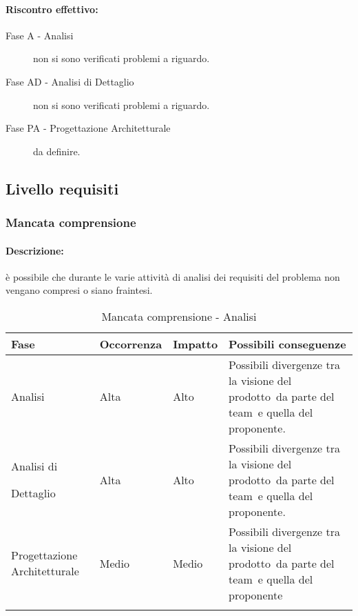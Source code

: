 \documentclass[../PianoProgetto.tex]{subfiles}
\begin{document}
	\paragraph*{Riscontro effettivo:}
		\begin{description}
			\item[Fase A - Analisi] non si sono verificati problemi a riguardo.
			\item[Fase AD - Analisi di Dettaglio] non si sono verificati problemi a riguardo.
			\item[Fase PA - Progettazione Architetturale] da definire.
		\end{description}

\newpage
\subsection{Livello requisiti}

\subsubsection{Mancata comprensione}
\label{sec:Mancata comprensione}

	\paragraph*{Descrizione:} è possibile che durante le varie attività di analisi dei requisiti del problema non vengano compresi o siano fraintesi.
	
	\begin{table}[h]
		\centering
		\begin{tabularx}{\textwidth}{F O O P}
			\toprule
			\textbf{Fase} & \textbf{Occorrenza} & \textbf{Impatto} & \textbf{Possibili conseguenze}\\
			\midrule
			Analisi & Alta & Alto & Possibili divergenze tra la visione del prodotto\g\ da parte del team\g\ e quella del proponente. \\
			\midrule
			Analisi di \par Dettaglio & Alta & Alto & Possibili divergenze tra la visione del prodotto\g\ da parte del team\g\ e quella del proponente.\\
			\midrule
			Progettazione Architetturale & Medio & Medio & Possibili divergenze tra la visione del prodotto\g\ da parte del team\g\ e quella del proponente \\
			\bottomrule
		\end{tabularx}
		\caption{Mancata comprensione - Analisi}
		\label{tab:Mancata comprensione - Analisi}	
	\end{table}
		
\end{document}
